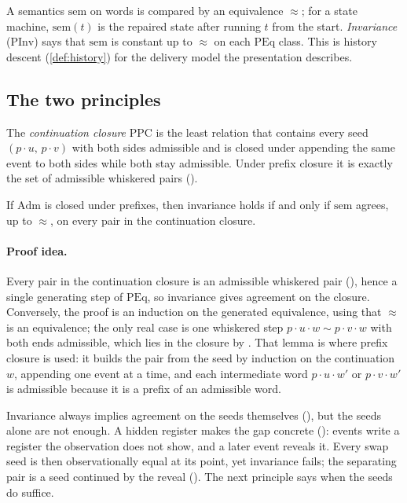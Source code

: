 A semantics $\mathrm{sem}$ on words is compared by an equivalence $\approx$; for a state machine,
$\mathrm{sem}(t)$ is the repaired state after running $t$ from the start. \emph{Invariance}
($\mathrm{PInv}$) says that $\mathrm{sem}$ is constant up to $\approx$ on each $\mathrm{PEq}$ class.
This is history descent (\cref{def:history}) for the delivery model the presentation describes.

\subsection{The two principles}

The \emph{continuation closure} $\mathrm{PPC}$ is the least relation that contains every seed
$(p \cdot u,\, p \cdot v)$ with both sides admissible and is closed under appending the same event to
both sides while both stay admissible. Under prefix closure it is exactly the set of admissible
whiskered pairs ().

\begin{theorem}\label{thm:p2}
If $\mathrm{Adm}$ is closed under prefixes, then invariance holds if and only if $\mathrm{sem}$ agrees,
up to $\approx$, on every pair in the continuation closure.
\end{theorem}

\paragraph{Proof idea.}
Every pair in the continuation closure is an admissible whiskered pair (), hence a
single generating step of $\mathrm{PEq}$, so invariance gives agreement on the closure. Conversely, the
proof is an induction on the generated equivalence, using that $\approx$ is an equivalence; the only
real case is one whiskered step $p \cdot u \cdot w \sim p \cdot v \cdot w$ with both ends admissible,
which lies in the closure by . That lemma is where prefix closure is used: it builds
the pair from the seed by induction on the continuation $w$, appending one event at a time, and each
intermediate word $p \cdot u \cdot w'$ or $p \cdot v \cdot w'$ is admissible because it is a prefix of
an admissible word.

Invariance always implies agreement on the seeds themselves (), but the seeds
alone are not enough. A hidden register makes the gap concrete (): events
write a register the observation does not show, and a later event reveals it. Every swap seed is then
observationally equal at its point, yet invariance fails; the separating pair is a seed continued by
the reveal (). The next principle says when the seeds do suffice.

